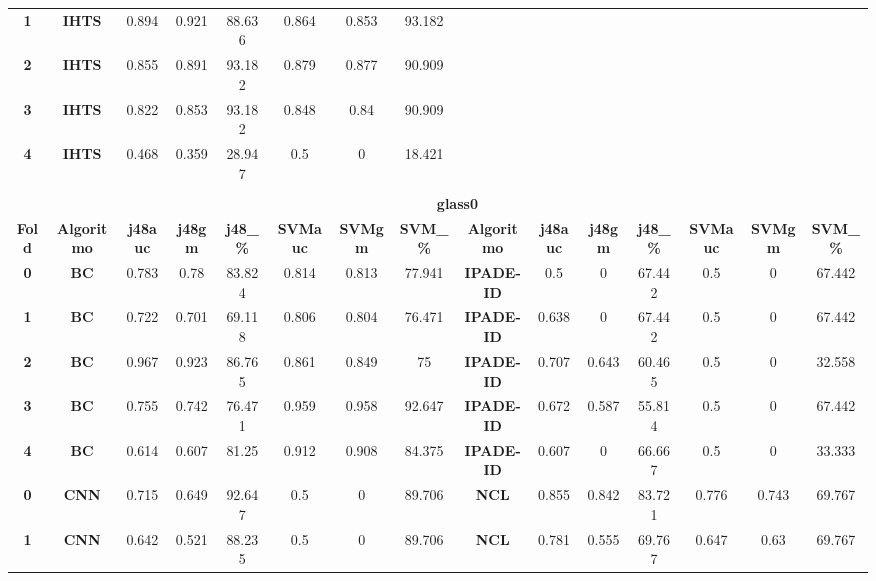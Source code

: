 {{\begin{tabular}{c|c|cccccc|ccccccc}
\textbf{1} & \textbf{IHTS} & 0.894 & 0.921 & 88.636 & 0.864 & 0.853 & 93.182 &       &       &       &       &       &       &  \\
\textbf{2} & \textbf{IHTS} & 0.855 & 0.891 & 93.182 & 0.879 & 0.877 & 90.909 &       &       &       &       &       &       &  \\
\textbf{3} & \textbf{IHTS} & 0.822 & 0.853 & 93.182 & 0.848 & 0.84  & 90.909 &       &       &       &       &       &       &  \\
\textbf{4} & \textbf{IHTS} & 0.468 & 0.359 & 28.947 & 0.5   & 0     & 18.421 &       &       &       &       &       &       &  \\
\multicolumn{1}{c}{} & \multicolumn{1}{c}{} &       &       &       &       &       & \multicolumn{1}{c}{} &       &       &       &       &       &       &  \\
\multicolumn{1}{c}{} & \multicolumn{14}{c}{\textbf{glass0}} \\
\midrule
\textbf{Fold} & \textbf{Algoritmo} & \textbf{j48auc} & \textbf{j48gm} & \textbf{j48\_\%} & \textbf{SVMauc} & \textbf{SVMgm} & \textbf{SVM\_\%} & \multicolumn{1}{c|}{\textbf{Algoritmo}} & \textbf{j48auc} & \textbf{j48gm} & \textbf{j48\_\%} & \textbf{SVMauc} & \textbf{SVMgm} & \textbf{SVM\_\%} \\
\midrule
\textbf{0} & \textbf{BC} & 0.783 & 0.78  & 83.824 & 0.814 & 0.813 & 77.941 & \multicolumn{1}{c|}{\textbf{IPADE-ID}} & 0.5   & 0     & 67.442 & 0.5   & 0     & 67.442 \\
\textbf{1} & \textbf{BC} & 0.722 & 0.701 & 69.118 & 0.806 & 0.804 & 76.471 & \multicolumn{1}{c|}{\textbf{IPADE-ID}} & 0.638 & 0     & 67.442 & 0.5   & 0     & 67.442 \\
\textbf{2} & \textbf{BC} & 0.967 & 0.923 & 86.765 & 0.861 & 0.849 & 75    & \multicolumn{1}{c|}{\textbf{IPADE-ID}} & 0.707 & 0.643 & 60.465 & 0.5   & 0     & 32.558 \\
\textbf{3} & \textbf{BC} & 0.755 & 0.742 & 76.471 & 0.959 & 0.958 & 92.647 & \multicolumn{1}{c|}{\textbf{IPADE-ID}} & 0.672 & 0.587 & 55.814 & 0.5   & 0     & 67.442 \\
\textbf{4} & \textbf{BC} & 0.614 & 0.607 & 81.25 & 0.912 & 0.908 & 84.375 & \multicolumn{1}{c|}{\textbf{IPADE-ID}} & 0.607 & 0     & 66.667 & 0.5   & 0     & 33.333 \\
\textbf{0} & \textbf{CNN} & 0.715 & 0.649 & 92.647 & 0.5   & 0     & 89.706 & \multicolumn{1}{c|}{\textbf{NCL}} & 0.855 & 0.842 & 83.721 & 0.776 & 0.743 & 69.767 \\
\textbf{1} & \textbf{CNN} & 0.642 & 0.521 & 88.235 & 0.5   & 0     & 89.706 & \multicolumn{1}{c|}{\textbf{NCL}} & 0.781 & 0.555 & 69.767 & 0.647 & 0.63  & 69.767 \\

\end{tabular}}}
